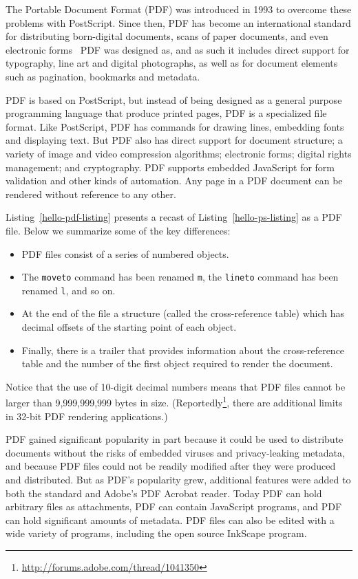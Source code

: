 The Portable Document Format (PDF) was introduced in 1993 to overcome
these problems with PostScript. Since then, PDF has become an
international standard for distributing born-digital documents, scans
of paper documents, and even electronic forms~ 
PDF was designed as, and as
such it includes direct support for typography, line art and digital
photographs, as well as for document elements such as pagination,
bookmarks and metadata. 

PDF is based on PostScript, but instead of being designed as a general
purpose programming language that produce printed pages, PDF is a
specialized file format. Like PostScript, PDF has
commands for drawing lines, embedding fonts and displaying text. But PDF also has direct support for
document structure; a variety of image and video compression
algorithms; electronic forms; digital rights management; and
cryptography. PDF supports embedded JavaScript for form validation
and other kinds of automation. Any page in a PDF document can be
rendered without reference to any other. 

Listing~\ref{hello-pdf-listing} presents a recast of
Listing~\ref{hello-ps-listing} as a PDF file. Below we summarize some
of the key differences:

\begin{itemize}
\item PDF files consist of a series of numbered objects. 
\item The \verb|moveto| command has been renamed \verb|m|, the
  \verb|lineto| command has been renamed \verb|l|, and so on.
\item At the end of the file a structure (called the cross-reference
  table) which has decimal offsets of the starting point of each object.
\item Finally, there is a trailer that provides information about the
  cross-reference table and the number of the first object required to
  render the document. 
\end{itemize}

Notice that the use of 10-digit decimal numbers means that PDF files
cannot be larger than 9,999,999,999 bytes in size. (Reportedly\footnote{\url{http://forums.adobe.com/thread/1041350}}, there
are additional limits in 32-bit PDF rendering applications.)





PDF gained significant popularity in part because it could be used to 
distribute documents without the  risks of embedded viruses and
privacy-leaking metadata, and because PDF files could not be readily
modified after they were produced and distributed. But as PDF's popularity grew, additional
features were added to both the standard and Adobe's PDF Acrobat
reader. Today PDF can hold arbitrary files as attachments, PDF can
contain JavaScript programs, and PDF can hold significant amounts of
metadata. PDF files can also be edited with a wide variety of
programs, including the open source InkScape program.


